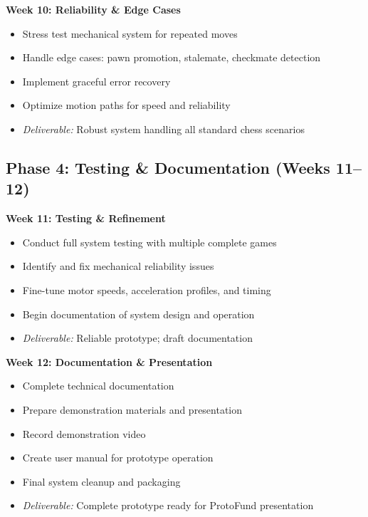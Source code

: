 \documentclass[11pt]{article}
\begin{document}
\noindent\textbf{Week 10: Reliability \& Edge Cases}
\begin{itemize}[noitemsep, leftmargin=2em]
    \item Stress test mechanical system for repeated moves
    \item Handle edge cases: pawn promotion, stalemate, checkmate detection
    \item Implement graceful error recovery
    \item Optimize motion paths for speed and reliability
    \item \textit{Deliverable:} Robust system handling all standard chess scenarios
\end{itemize}

\vspace{0.5em}

\subsection*{\textcolor{phaseD}{Phase 4: Testing \& Documentation (Weeks 11--12)}}

\noindent\textbf{Week 11: Testing \& Refinement}
\begin{itemize}[noitemsep, leftmargin=2em]
    \item Conduct full system testing with multiple complete games
    \item Identify and fix mechanical reliability issues
    \item Fine-tune motor speeds, acceleration profiles, and timing
    \item Begin documentation of system design and operation
    \item \textit{Deliverable:} Reliable prototype; draft documentation
\end{itemize}

\noindent\textbf{Week 12: Documentation \& Presentation}
\begin{itemize}[noitemsep, leftmargin=2em]
    \item Complete technical documentation
    \item Prepare demonstration materials and presentation
    \item Record demonstration video
    \item Create user manual for prototype operation
    \item Final system cleanup and packaging
    \item \textit{Deliverable:} Complete prototype ready for ProtoFund presentation
\end{itemize}
\end{document}
